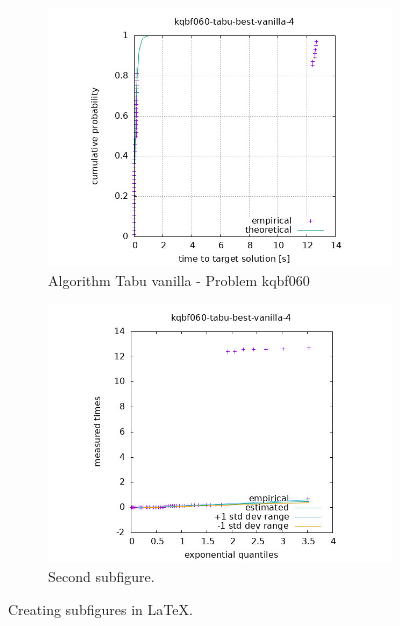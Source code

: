 \begin{figure}[H]
    \centering
    \begin{subfigure}{0.49\textwidth}
        \includegraphics[width=\textwidth]{figure/ttt_plot/kqbf060-tabu-best-vanilla-4-exp.jpeg}
        \caption{Algorithm Tabu vanilla - Problem kqbf060}
        \label{fig:tabu-vanilla-kqbf060-exp}
    \end{subfigure}
    \hfill
    \begin{subfigure}{0.49\textwidth}
        \includegraphics[width=\textwidth]{figure/ttt_plot/kqbf060-tabu-best-vanilla-4-qq.jpeg}
        \caption{Second subfigure.}
        \label{fig:tabu-vanilla-kqbf060-qq}
    \end{subfigure}
    \caption{Creating subfigures in \LaTeX.}
    \label{fig:tabu-vanilla-kqbf060}
\end{figure}


